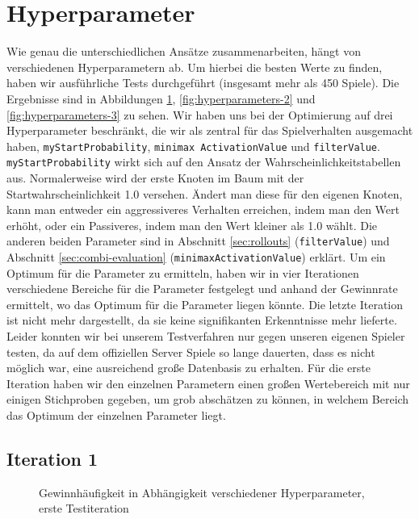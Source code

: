 \documentclass[12pt,a4paper]{article}
\begin{document}
\section{Hyperparameter}\label{sec:combi-hyperparameter}
Wie genau die unterschiedlichen Ansätze zusammenarbeiten, hängt von verschiedenen Hyperparametern ab. Um hierbei die besten Werte zu finden, haben wir ausführliche Tests durchgeführt (insgesamt mehr als 450 Spiele). Die Ergebnisse sind in Abbildungen \ref{fig:hyperparameters-1}, \ref{fig:hyperparameters-2} und \ref{fig:hyperparameters-3} zu sehen. Wir haben uns bei der Optimierung auf drei Hyperparameter beschränkt, die wir als zentral für das Spielverhalten ausgemacht haben, \texttt{myStartProbability}, \texttt{minimax\ ActivationValue} und \texttt{filterValue}. \texttt{myStartProbability} wirkt sich auf den Ansatz der Wahrscheinlichkeitstabellen aus. Normalerweise wird der erste Knoten im Baum mit der Startwahrscheinlichkeit 1.0 versehen. Ändert man diese für den eigenen Knoten, kann man entweder ein aggressiveres Verhalten erreichen, indem man den Wert erhöht, oder ein Passiveres, indem man den Wert kleiner als 1.0 wählt. Die anderen beiden Parameter sind in Abschnitt \ref{sec:rollouts} (\texttt{filterValue}) und Abschnitt \ref{sec:combi-evaluation} (\texttt{minimaxActivationValue}) erklärt. Um ein Optimum für die Parameter zu ermitteln, haben wir in vier Iterationen verschiedene Bereiche für die Parameter festgelegt und anhand der Gewinnrate ermittelt, wo das Optimum für die Parameter liegen könnte. Die letzte Iteration ist nicht mehr dargestellt, da sie keine signifikanten Erkenntnisse mehr lieferte. Leider konnten wir bei unserem Testverfahren nur gegen unseren eigenen Spieler testen, da auf dem offiziellen Server Spiele so lange dauerten, dass es nicht möglich war, eine ausreichend große Datenbasis zu erhalten. Für die erste Iteration haben wir den einzelnen Parametern einen großen Wertebereich mit nur einigen Stichproben gegeben, um grob abschätzen zu können, in welchem Bereich das Optimum der einzelnen Parameter liegt.



\subsection{Iteration 1}

\begin{figure}[h]
    \centering
    
    \caption{Gewinnhäufigkeit in Abhängigkeit verschiedener Hyperparameter, erste Testiteration}
    \label{fig:hyperparameters-1}
\end{figure}
\end{document}

